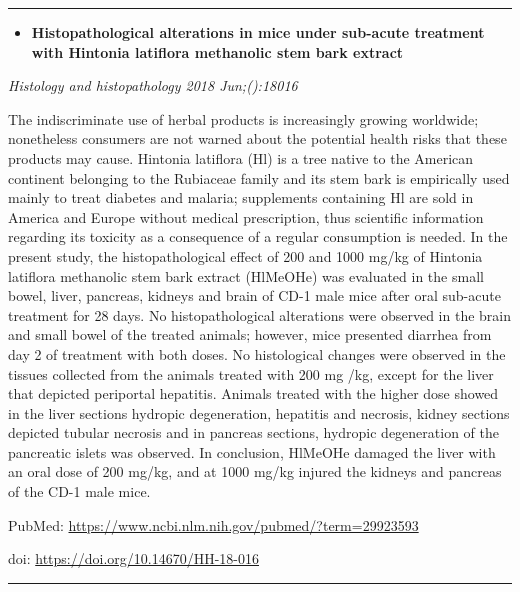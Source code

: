 \documentclass[]{article}
\providecommand{\tightlist}{%
  \setlength{\itemsep}{0pt}\setlength{\parskip}{0pt}}
\begin{document}
{}

\begin{center}\rule{0.5\linewidth}{\linethickness}\end{center}

\begin{itemize}
\tightlist
\item
  \textbf{Histopathological alterations in mice under sub-acute
  treatment with Hintonia latiflora methanolic stem bark extract}
\end{itemize}

\emph{Histology and histopathology 2018 Jun;():18016}

The indiscriminate use of herbal products is increasingly growing
worldwide; nonetheless consumers are not warned about the potential
health risks that these products may cause. Hintonia latiflora (Hl) is a
tree native to the American continent belonging to the Rubiaceae family
and its stem bark is empirically used mainly to treat diabetes and
malaria; supplements containing Hl are sold in America and Europe
without medical prescription, thus scientific information regarding its
toxicity as a consequence of a regular consumption is needed. In the
present study, the histopathological effect of 200 and 1000 mg/kg of
Hintonia latiflora methanolic stem bark extract (HlMeOHe) was evaluated
in the small bowel, liver, pancreas, kidneys and brain of CD-1 male mice
after oral sub-acute treatment for 28 days. No histopathological
alterations were observed in the brain and small bowel of the treated
animals; however, mice presented diarrhea from day 2 of treatment with
both doses. No histological changes were observed in the tissues
collected from the animals treated with 200 mg /kg, except for the liver
that depicted periportal hepatitis. Animals treated with the higher dose
showed in the liver sections hydropic degeneration, hepatitis and
necrosis, kidney sections depicted tubular necrosis and in pancreas
sections, hydropic degeneration of the pancreatic islets was observed.
In conclusion, HlMeOHe damaged the liver with an oral dose of 200 mg/kg,
and at 1000 mg/kg injured the kidneys and pancreas of the CD-1 male
mice.

PubMed: \url{https://www.ncbi.nlm.nih.gov/pubmed/?term=29923593}

doi: \url{https://doi.org/10.14670/HH-18-016}

{}

{}

\begin{center}\rule{0.5\linewidth}{\linethickness}\end{center}
\end{document}
